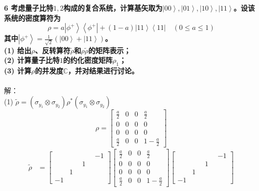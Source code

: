 \documentclass[12pt]{article}
\numberwithin{equation}{section}	 %
\begin{document}
\begin{spacing}{1.5}
\textbf{6 \quad 考虑量子比特$1, 2$构成的复合系统，计算基矢取为$\left|00\right>,\left|01\right>,\left|10\right>,\left|11\right>$。设该系统的密度算符为
\begin{equation}\nonumber 		%
\rho = a\left|\phi^{+}\right>\left<\phi^{+}\right| + (1-a)\left|11\right>\left<11\right| \quad (0 \le a \le 1)
\end{equation}
其中$\displaystyle \left|\phi^{+}\right>=\frac{1}{\sqrt{2}}\left(\left|00\right>+\left|11\right>\right)$。\\
(1) 给出$\rho$、反转算符$\tilde\rho$和$\rho\tilde\rho$的矩阵表示；\\
(2) 计算量子比特$1$的约化密度矩阵$\rho_{1}$；\\
(3) 计算$\rho$的并发度$\mathbb{C}$，并对结果进行讨论。		%
}\\
~\\
解：\\
(1) $\tilde{\rho} = (\sigma_{y_{1}}\otimes\sigma_{y_{2}})\rho^{*}(\sigma_{y_{1}}\otimes\sigma_{y_{2}})$
\begin{equation}\nonumber 		%
\rho = \begin{bmatrix} \displaystyle \frac{a}{2} & 0 & 0 & \displaystyle \frac{a}{2} \\ 0 & 0 & 0 & 0 \\ 0 & 0 & 0 & 0 \\ \displaystyle \frac{a}{2} & 0 & 0 & \displaystyle 1-\frac{a}{2} \end{bmatrix}
\end{equation}
\begin{align*}
\tilde{\rho} &= \begin{bmatrix} \quad & \quad & \quad & -1 \\ \quad & \quad & 1 &\quad \\ \quad & 1 & \quad & \quad \\ -1 & \quad & \quad & \quad \end{bmatrix} \begin{bmatrix} \displaystyle \frac{a}{2} & 0 & 0 & \displaystyle \frac{a}{2} \\ 0 & 0 & 0 & 0 \\ 0 & 0 & 0 & 0 \\ \displaystyle \frac{a}{2} & 0 & 0 & \displaystyle 1-\frac{a}{2} \end{bmatrix} \begin{bmatrix} \quad & \quad & \quad & -1 \\ \quad & \quad & 1 &\quad \\ \quad & 1 & \quad & \quad \\ -1 & \quad & \quad & \quad \end{bmatrix} \\

\end{align*}
\end{spacing}
\end{document}
